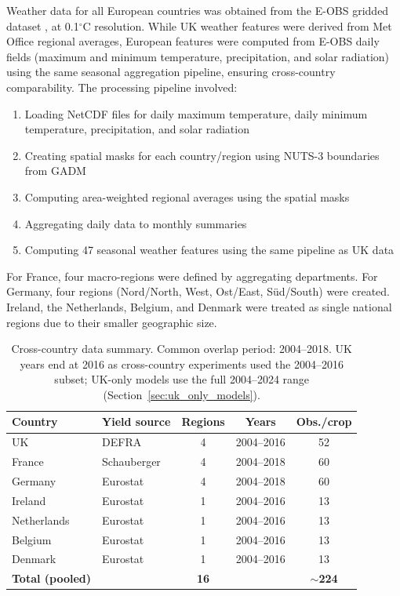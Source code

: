 \documentclass[12pt,a4paper]{report}
\newcommand{\degrees}{$^{\circ}$C}
\begin{document}
Weather data for all European countries was obtained from the E-OBS gridded dataset \citep{cornes2018}, at 0.1\degrees{} resolution. While UK weather features were derived from Met Office regional averages, European features were computed from E-OBS daily fields (maximum and minimum temperature, precipitation, and solar radiation) using the same seasonal aggregation pipeline, ensuring cross-country comparability. The processing pipeline involved:

\begin{enumerate}
    \item Loading NetCDF files for daily maximum temperature, daily minimum temperature, precipitation, and solar radiation
    \item Creating spatial masks for each country/region using NUTS-3 boundaries from GADM
    \item Computing area-weighted regional averages using the spatial masks
    \item Aggregating daily data to monthly summaries
    \item Computing 47 seasonal weather features using the same pipeline as UK data
\end{enumerate}

For France, four macro-regions were defined by aggregating departments. For Germany, four regions (Nord/North, West, Ost/East, S\"{u}d/South) were created. Ireland, the Netherlands, Belgium, and Denmark were treated as single national regions due to their smaller geographic size.

\begin{table}[H]
\centering
\caption{Cross-country data summary. Common overlap period: 2004--2018. UK years end at 2016 as cross-country experiments used the 2004--2016 subset; UK-only models use the full 2004--2024 range (Section~\ref{sec:uk_only_models}).}
\label{tab:cross_country_data}
\begin{tabular}{llccc}
\toprule
\textbf{Country} & \textbf{Yield source} & \textbf{Regions} & \textbf{Years} & \textbf{Obs./crop} \\
\midrule
UK & DEFRA & 4 & 2004--2016 & 52 \\
France & Schauberger & 4 & 2004--2018 & 60 \\
Germany & Eurostat & 4 & 2004--2018 & 60 \\
Ireland & Eurostat & 1 & 2004--2016 & 13 \\
Netherlands & Eurostat & 1 & 2004--2016 & 13 \\
Belgium & Eurostat & 1 & 2004--2016 & 13 \\
Denmark & Eurostat & 1 & 2004--2016 & 13 \\
\midrule
\textbf{Total (pooled)} & & \textbf{16} & & \textbf{$\sim$224} \\
\bottomrule
\end{tabular}
\end{table}
\end{document}
